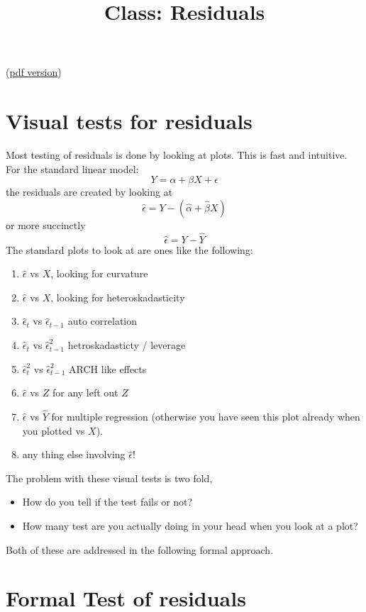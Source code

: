 \documentclass[12pt]{article}
\begin{document}
\title{Class: Residuals}

(\href{class_residuals.pdf}{pdf version})

\section{Visual tests for residuals}

Most testing of residuals is done by looking at plots.  This is fast
and intuitive.  For the standard linear model:
\begin{displaymath}
Y = \alpha + \beta X + \epsilon
\end{displaymath}
the residuals are created by looking at
\begin{displaymath}
\hat\epsilon = Y - (\hat\alpha + \hat\beta X)
\end{displaymath}
or more succinctly
\begin{displaymath}
\hat\epsilon = Y - \hat Y
\end{displaymath}
The standard plots to look at are ones like the following:
\begin{enumerate}
\item $\hat\epsilon$ vs $X$, looking for curvature
\item $\hat\epsilon$ vs $X$, looking for heteroskadasticity
\item $\hat\epsilon_t$ vs $\hat\epsilon_{t-1}$ auto correlation
\item $\hat\epsilon_t$ vs $\hat\epsilon_{t-1}^2$ hetroskadasticty / leverage
\item $\hat\epsilon_t^2$ vs $\hat\epsilon_{t-1}^2$ ARCH like effects
\item $\hat\epsilon$ vs $Z$ for any left out $Z$
\item $\hat\epsilon$ vs $\hat Y$ for multiple regression (otherwise
you have seen this plot already when you plotted vs $X$).
\item any thing else involving $\hat\epsilon$!
\end{enumerate}
The problem with these visual tests is two fold, 
\begin{itemize}
\item How do you tell if the test fails or not?
\item How many test are you actually doing in your head when you look
at a plot?
\end{itemize}
Both of these are addressed in the following formal approach.

\section{Formal Test of residuals}
\end{document}

